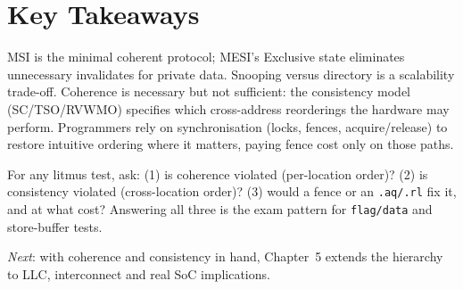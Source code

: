 \section{Key Takeaways}
MSI is the minimal coherent protocol; MESI's Exclusive state eliminates unnecessary invalidates for private data. Snooping versus directory is a scalability trade-off. Coherence is necessary but not sufficient: the consistency model (SC/TSO/RVWMO) specifies which cross-address reorderings the hardware may perform. Programmers rely on synchronisation (locks, fences, acquire/release) to restore intuitive ordering where it matters, paying fence cost only on those paths.

\begin{remark}[Checklist]
For any litmus test, ask: (1) is coherence violated (per-location order)? (2) is consistency violated (cross-location order)? (3) would a fence or an \texttt{.aq/.rl} fix it, and at what cost? Answering all three is the exam pattern for \texttt{flag/data} and store-buffer tests.
\end{remark}

\textit{Next}: with coherence and consistency in hand, Chapter~5 extends the hierarchy to LLC, interconnect and real SoC implications.


